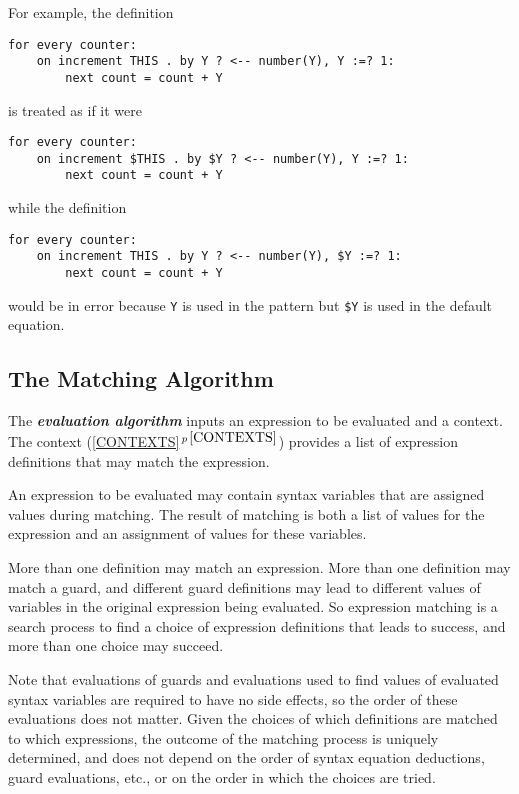 \documentclass[12pt]{article}
\newcommand{\key}[1]{{\bf \em #1}\index{#1}}
\newcommand{\secref}[1]{\ref{#1}$\,^{p\,\pageref{#1}}$}
\newenvironment{indpar}[1][0.3in]%
	{\begin{list}{}%
		     {\setlength{\itemsep}{0in}%
		      \setlength{\topsep}{0in}%
		      \setlength{\parsep}{1ex}%
		      \setlength{\labelwidth}{#1}%
		      \setlength{\leftmargin}{#1}%
		      \addtolength{\leftmargin}{\labelsep}}%
	 \item}%
	{\end{list}}
\begin{document}
For example, the definition

\begin{indpar}\begin{verbatim}
for every counter:
    on increment THIS . by Y ? <-- number(Y), Y :=? 1:
        next count = count + Y
\end{verbatim}\end{indpar}

is treated as if it were

\begin{indpar}\begin{verbatim}
for every counter:
    on increment $THIS . by $Y ? <-- number(Y), Y :=? 1:
        next count = count + Y
\end{verbatim}\end{indpar}

while the definition

\begin{indpar}\begin{verbatim}
for every counter:
    on increment THIS . by Y ? <-- number(Y), $Y :=? 1:
        next count = count + Y
\end{verbatim}\end{indpar}

would be in error because \verb|Y| is used in the pattern but
\verb|$Y| is used in the default equation.

\subsection{The Matching Algorithm}
\label{MATCHING-ALGORITHM}

The \key{evaluation algorithm} inputs an expression to be evaluated
and a context.  The context (\secref{CONTEXTS}) provides a list of expression
definitions that may match the expression.

An expression to be evaluated may contain syntax variables that are assigned
values during matching.  The result of matching is both a list of values for
the expression and an assignment of values for these variables.

More than one definition may match an expression.
More than one definition may match a guard,
and different guard definitions may lead to different
values of variables in the original expression being evaluated.
So expression matching is a search process to find a choice
of expression definitions that
leads to success, and more than one choice may succeed.

Note that evaluations of guards and evaluations
used to find values of evaluated syntax variables are required to have
no side effects, so the order of these evaluations does not matter.
Given the choices of which definitions are matched to which expressions,
the outcome of the matching process is uniquely determined, and does not
depend on the order of syntax equation deductions, guard evaluations, etc.,
or on the order in which the choices are tried.
\end{document}
